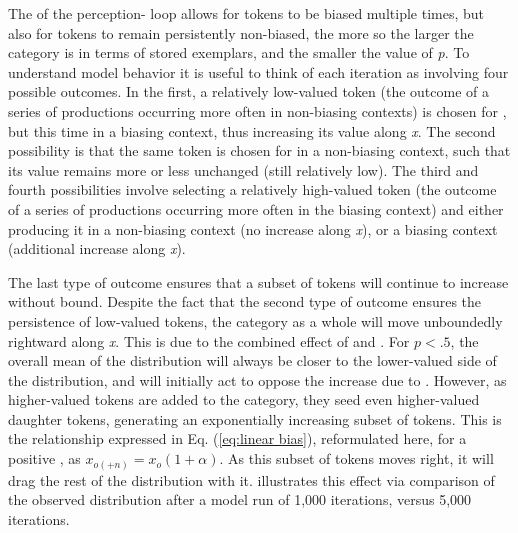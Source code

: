 The  of the perception- loop allows for tokens
to be biased multiple times, but also for tokens to remain persistently
non-biased, the more so the larger the category is in terms of stored
exemplars, and the smaller the value of \emph{p}. To understand model
behavior it is useful to think of each iteration as involving four
possible outcomes. In the first, a relatively low-valued token (the
outcome of a series of productions occurring more often in non-biasing
contexts) is chosen for , but this time in a biasing context,
thus increasing its value along \emph{x}. The second possibility is
that the same token is chosen for  in a non-biasing context,
such that its value remains more or less unchanged (still relatively
low). The third and fourth possibilities involve selecting a relatively
high-valued token (the outcome of a series of productions occurring
more often in the biasing context) and either producing it in a non-biasing
context (no increase along \emph{x}), or a biasing context (additional
increase along \emph{x}). 

The last type of outcome ensures that a subset of tokens will continue
to increase without bound. Despite the fact that the second type of
outcome ensures the persistence of low-valued tokens, the category
as a whole will move unboundedly rightward along \emph{x}. This is
due to the combined effect of  and . For $p<.5$,
the overall mean of the distribution will always be closer to the
lower-valued side of the distribution, and will initially act to oppose
the increase due to  . However, as higher-valued tokens
are added to the category, they seed even higher-valued daughter tokens,
generating an exponentially increasing subset of tokens. This is the
relationship expressed in Eq. (\ref{eq:linear bias}), reformulated
here, for a positive , as $x_{o(+n)}=x_{o}(1+\alpha)$. As this
subset of tokens moves right, it will drag the rest of the distribution
with it.  illustrates this effect
via comparison of the observed distribution after a model run of 1,000
iterations, versus 5,000 iterations.

